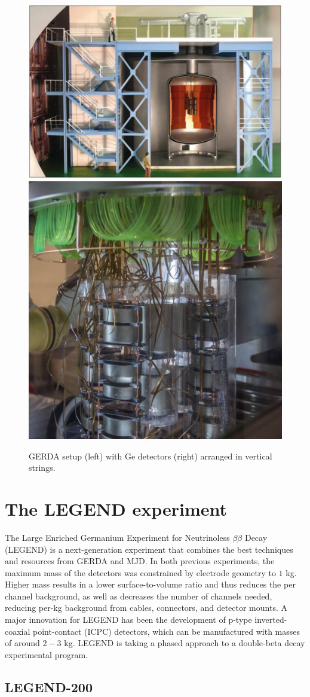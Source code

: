 \begin{figure}
\centering
\includegraphics[height=0.385\columnwidth]{ch2/figs/gerda_setup.pdf}
\qquad
\includegraphics[height=0.385\columnwidth]{ch2/figs/gerdastrings.pdf}
\caption{GERDA setup (left) with Ge detectors (right) arranged in vertical strings.}
\label{fig:gerda}
\end{figure}
  
\section{The LEGEND experiment}
The Large Enriched Germanium Experiment for Neutrinoless $\beta\beta$ Decay (LEGEND) is a next-generation experiment that combines the best techniques and resources from GERDA and MJD. In both previous experiments, the maximum mass of the detectors was constrained by electrode geometry to $1$ kg. Higher mass results in a lower surface-to-volume ratio and thus reduces the per channel background, as well as decreases the number of channels needed, reducing per-kg background from cables, connectors, and detector mounts. A major innovation for LEGEND has been the development of p-type inverted-coaxial point-contact (ICPC) detectors, which can be manufactured with masses of around $2-3$ kg. LEGEND is taking a phased approach to a double-beta decay experimental program.

\subsection{LEGEND-200}

